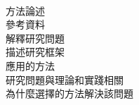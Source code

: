 \begin{flushleft}
{\large {}}\\
\end{flushleft}

方法論述\\

參考資料\\

解釋研究問題\\

描述研究框架\\

應用的方法\\

研究問題與理論和實踐相關\\

為什麼選擇的方法解決該問題\\

